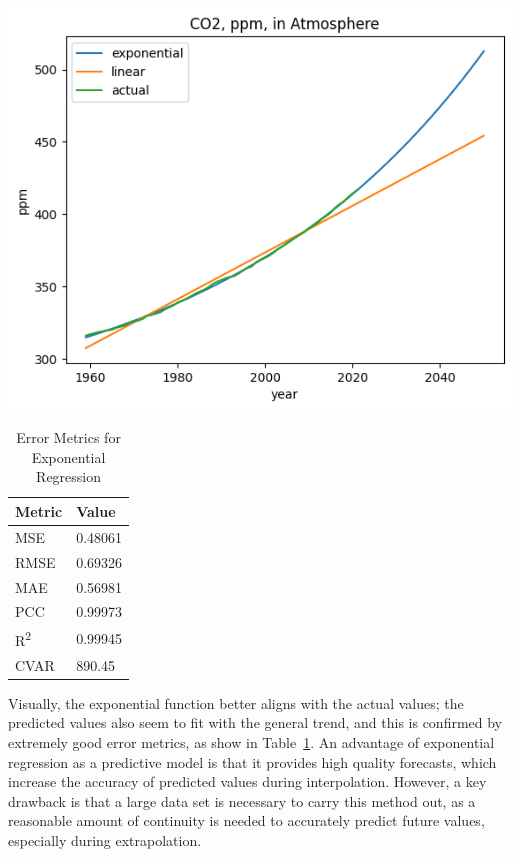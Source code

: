 \documentclass{mcmthesis}
\begin{document}
    \begin{table}[h]
        \begin{minipage}{0.7\linewidth}
            \centering
            \includegraphics[width=\textwidth]{exponential}%
            \label{fig:co2_exp}
        \end{minipage}%
        \begin{minipage}{0.3\linewidth}
            \centering
            \begin{tabular}{ll}
                \toprule
                Metric               & Value  \\
                \midrule
                MSE                  & 0.48061 \\
                RMSE                 & 0.69326 \\
                MAE                  & 0.56981 \\
                PCC                  & 0.99973 \\
                R\textsuperscript{2} & 0.99945 \\
                CVAR                 & 890.45 \\
                \bottomrule
            \end{tabular}
            \caption{Error Metrics for Exponential Regression}
            \label{tab:co2_exp_err}
        \end{minipage}
    \end{table}

    Visually, the exponential function better aligns with the actual values; the predicted values also seem to fit with the general trend, and this is confirmed by extremely good error metrics, as show in Table~\ref{tab:co2_exp_err}.
    An advantage of exponential regression as a predictive model is that it provides high quality forecasts, which increase the accuracy of predicted values during interpolation.
    However, a key drawback is that a large data set is necessary to carry this method out, as a reasonable amount of continuity is needed to accurately predict future values, especially during extrapolation.
\end{document}
